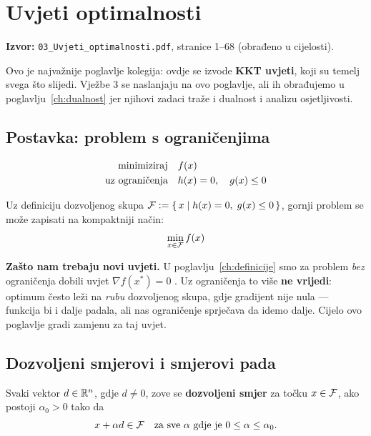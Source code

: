 \chapter{Uvjeti optimalnosti}
\label{ch:uvjeti}

\begin{izvor}
\textbf{Izvor:} \texttt{03\_Uvjeti\_optimalnosti.pdf}, stranice 1--68
(obrađeno u cijelosti).

Ovo je najvažnije poglavlje kolegija: ovdje se izvode \textbf{KKT uvjeti}, koji
su temelj svega što slijedi. Vježbe 3 se naslanjaju na ovo poglavlje, ali ih
obrađujemo u poglavlju~\ref{ch:dualnost} jer njihovi zadaci traže i dualnost i
analizu osjetljivosti.
\end{izvor}

\section{Postavka: problem s ograničenjima}

\begin{equation}
\begin{aligned}
\minim & f(x) \\
\uzogr & h(x) = 0, \quad g(x) \le 0
\end{aligned}
\end{equation}

Uz definiciju dozvoljenog skupa
$\Feas := \{\, x \mid h(x) = 0,\; g(x) \le 0 \,\}$, gornji problem se može
zapisati na kompaktniji način:
\[
\min_{x\in\Feas} f(x)
\]

\textbf{Zašto nam trebaju novi uvjeti.} U poglavlju~\ref{ch:definicije} smo za
problem \emph{bez} ograničenja dobili uvjet $\nabla f(x^{*}) = 0$
. Uz ograničenja to više \textbf{ne vrijedi}: optimum često leži na
\emph{rubu} dozvoljenog skupa, gdje gradijent nije nula --- funkcija bi i dalje
padala, ali nas ograničenje sprječava da idemo dalje. Cijelo ovo poglavlje
gradi zamjenu za taj uvjet.

\section{Dozvoljeni smjerovi i smjerovi pada}
\label{sec:smjerovi}

\begin{definicija}
Svaki vektor $d \in \R^n$, gdje $d \ne 0$, zove se \textbf{dozvoljeni smjer} za
točku $x \in \Feas$, ako postoji $\alpha_0 > 0$ tako da
\[
x + \alpha d \in \Feas \quad\text{za sve }\alpha\text{ gdje je }
0 \le \alpha \le \alpha_0.
\]
\end{definicija}

